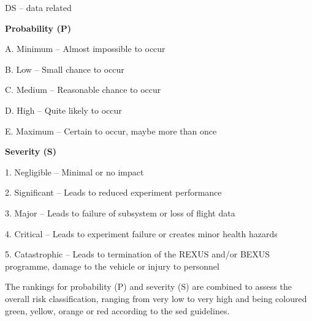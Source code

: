 DS -- data related

\textbf{Probability (P)}

A. Minimum -- Almost impossible to occur

B. Low -- Small chance to occur

C. Medium -- Reasonable chance to occur

D. High -- Quite likely to occur

E. Maximum -- Certain to occur, maybe more than once

\textbf{Severity (S)}

1. Negligible -- Minimal or no impact

2. Significant -- Leads to reduced experiment performance

3. Major -- Leads to failure of subsystem or loss of flight data

4. Critical -- Leads to experiment failure or creates minor health hazards

5. Catastrophic -- Leads to termination of the REXUS and/or BEXUS programme, damage to the vehicle or injury to personnel

The rankings for probability (P) and severity (S) are combined to assess the overall risk classification, ranging from very low to very high and being coloured green, yellow, orange or red according to the \gls{sed} guidelines.

